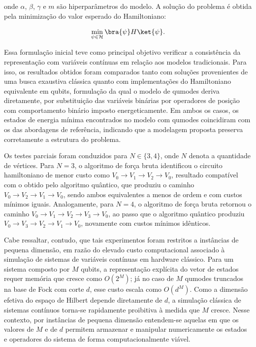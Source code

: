     onde $\alpha$, $\beta$, $\gamma$ e $m$ são hiperparâmetros do modelo. A solução do problema é obtida pela minimização do valor esperado do Hamiltoniano:

    \begin{equation}
    \min_{\psi \in \mathcal{H}} \bra{\psi} H \ket{\psi}.
    \end{equation}

    Essa formulação inicial teve como principal objetivo verificar a consistência da representação com variáveis contínuas em relação aos modelos tradicionais. Para isso, os resultados obtidos foram comparados tanto com soluções provenientes de uma busca exaustiva clássica quanto com implementações do Hamiltoniano equivalente em qubits, formulação da qual o modelo de qumodes deriva diretamente, por substituição das variáveis binárias por operadores de posição com comportamento binário imposto energeticamente. Em ambos os casos, os estados de energia mínima encontrados no modelo com qumodes coincidiram com os das abordagens de referência, indicando que a modelagem proposta preserva corretamente a estrutura do problema.

    Os testes parciais foram conduzidos para $N \in \{3, 4\}$, onde $N$ denota a quantidade de vértices. Para $N = 3$, o algoritmo de força bruta identificou o circuito hamiltoniano de menor custo como $V_0 \rightarrow V_1 \rightarrow V_2 \rightarrow V_0$, resultado compatível com o obtido pelo algoritmo quântico, que produziu o caminho $V_0 \rightarrow V_2 \rightarrow V_1 \rightarrow V_0$, sendo ambos equivalentes a menos de ordem e com custos mínimos iguais. Analogamente, para $N = 4$, o algoritmo de força bruta retornou o caminho $V_0 \rightarrow V_1 \rightarrow V_2 \rightarrow V_3 \rightarrow V_0$, ao passo que o algoritmo quântico produziu $V_0 \rightarrow V_3 \rightarrow V_2 \rightarrow V_1 \rightarrow V_0$, novamente com custos mínimos idênticos. 

    Cabe ressaltar, contudo, que tais experimentos foram restritos a instâncias de pequena dimensão, em razão do elevado custo computacional associado à simulação de sistemas de variáveis contínuas em hardware clássico. Para um sistema composto por $M$ qubits, a representação explícita do vetor de estados requer memória que cresce como $O(2^M)$; já no caso de $M$ qumodes truncados na base de Fock com corte $d$, esse custo escala como $O(d^M)$. Como a dimensão efetiva do espaço de Hilbert depende diretamente de $d$, a simulação clássica de sistemas contínuos torna-se rapidamente proibitiva à medida que $M$ cresce. Nesse contexto, por instâncias de pequena dimensão entendem-se aquelas em que os valores de $M$ e de $d$ permitem armazenar e manipular numericamente os estados e operadores do sistema de forma computacionalmente viável.

